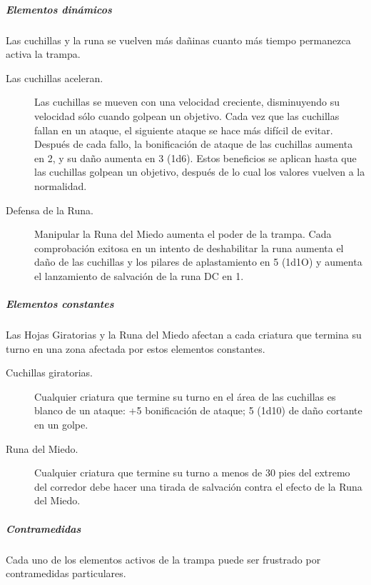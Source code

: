 \documentclass[a4paper,twocolumn,openany,10pt]{dndbook}
\begin{document}
\subparagraph{Elementos dinámicos} Las cuchillas y la runa se vuelven más dañinas cuanto más tiempo permanezca activa la trampa. 

\begin{description}
	\item[Las cuchillas aceleran.] Las cuchillas se mueven con una velocidad creciente, disminuyendo su velocidad sólo cuando
	golpean un objetivo. Cada vez que las cuchillas fallan en un ataque, el siguiente ataque se hace más difícil de evitar.
	Después de cada fallo, la bonificación de ataque de las cuchillas aumenta en 2, y su daño aumenta en 3 (1d6). Estos
	beneficios se aplican hasta que las cuchillas golpean un objetivo, después de lo cual los valores vuelven a la normalidad.

	\item[Defensa de la Runa.] Manipular la Runa del Miedo aumenta el poder de la trampa. Cada comprobación exitosa en un intento
	de deshabilitar la runa aumenta el daño de las cuchillas y los pilares de aplastamiento en 5 (1d1O) y aumenta el lanzamiento
	de salvación de la runa DC en 1.
\end{description}

\subparagraph{Elementos constantes} Las Hojas Giratorias y la Runa del Miedo afectan a cada criatura que termina su turno en una
zona afectada por estos elementos constantes. 

\begin{description}
	\item[Cuchillas giratorias.] Cualquier criatura que termine su turno en el área de las cuchillas es blanco de un ataque: +5
	bonificación de ataque; 5 (1d10) de daño cortante en un golpe.

	\item[Runa del Miedo.] Cualquier criatura que termine su turno a menos de 30 pies del extremo del corredor debe hacer una
	tirada de salvación contra el efecto de la Runa del Miedo. 
\end{description}

\subparagraph{Contramedidas} Cada uno de los elementos activos de la trampa puede ser frustrado por contramedidas particulares.
\end{document}
